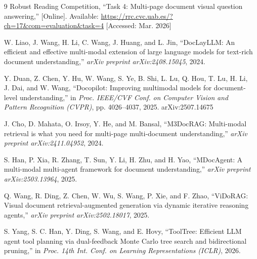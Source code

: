 \documentclass[12pt, a4paper]{article}
\begin{document}
\begin{thebibliography}{9}
Robust Reading Competition, ``Task 4: Multi-page document visual question answering,'' [Online]. Available: \url{https://rrc.cvc.uab.es/?ch=17&com=evaluation&task=4} [Accessed: Mar. 2026]

W. Liao, J. Wang, H. Li, C. Wang, J. Huang, and L. Jin, ``DocLayLLM: An efficient and effective multi-modal extension of large language models for text-rich document understanding,'' \textit{arXiv preprint arXiv:2408.15045}, 2024.

Y. Duan, Z. Chen, Y. Hu, W. Wang, S. Ye, B. Shi, L. Lu, Q. Hou, T. Lu, H. Li, J. Dai, and W. Wang, ``Docopilot: Improving multimodal models for document-level understanding,'' in \textit{Proc. IEEE/CVF Conf. on Computer Vision and Pattern Recognition (CVPR)}, pp. 4026--4037, 2025. arXiv:2507.14675

J. Cho, D. Mahata, O. Irsoy, Y. He, and M. Bansal, ``M3DocRAG: Multi-modal retrieval is what you need for multi-page multi-document understanding,'' \textit{arXiv preprint arXiv:2411.04952}, 2024.

S. Han, P. Xia, R. Zhang, T. Sun, Y. Li, H. Zhu, and H. Yao, ``MDocAgent: A multi-modal multi-agent framework for document understanding,'' \textit{arXiv preprint arXiv:2503.13964}, 2025.

Q. Wang, R. Ding, Z. Chen, W. Wu, S. Wang, P. Xie, and F. Zhao, ``ViDoRAG: Visual document retrieval-augmented generation via dynamic iterative reasoning agents,'' \textit{arXiv preprint arXiv:2502.18017}, 2025.

S. Yang, S. C. Han, Y. Ding, S. Wang, and E. Hovy, ``ToolTree: Efficient LLM agent tool planning via dual-feedback Monte Carlo tree search and bidirectional pruning,'' in \textit{Proc. 14th Int. Conf. on Learning Representations (ICLR)}, 2026.

\end{thebibliography}
\end{document}
